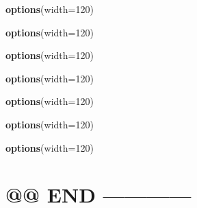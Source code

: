 \documentclass[
]{article}
\newenvironment{Shaded}{\begin{snugshade}}{\end{snugshade}}
\newcommand{\AttributeTok}[1]{\textcolor[rgb]{0.13,0.29,0.53}{#1}}
\newcommand{\DecValTok}[1]{\textcolor[rgb]{0.00,0.00,0.81}{#1}}
\newcommand{\FunctionTok}[1]{\textcolor[rgb]{0.13,0.29,0.53}{\textbf{#1}}}
\newcommand{\NormalTok}[1]{#1}
\begin{document}
\begin{Shaded}
\begin{Highlighting}[]
\FunctionTok{options}\NormalTok{(}\AttributeTok{width=}\DecValTok{120}\NormalTok{)}
\end{Highlighting}
\end{Shaded}

\begin{Shaded}
\begin{Highlighting}[]
\FunctionTok{options}\NormalTok{(}\AttributeTok{width=}\DecValTok{120}\NormalTok{)}
\end{Highlighting}
\end{Shaded}

\begin{Shaded}
\begin{Highlighting}[]
\FunctionTok{options}\NormalTok{(}\AttributeTok{width=}\DecValTok{120}\NormalTok{)}
\end{Highlighting}
\end{Shaded}

\begin{Shaded}
\begin{Highlighting}[]
\FunctionTok{options}\NormalTok{(}\AttributeTok{width=}\DecValTok{120}\NormalTok{)}
\end{Highlighting}
\end{Shaded}

\begin{Shaded}
\begin{Highlighting}[]
\FunctionTok{options}\NormalTok{(}\AttributeTok{width=}\DecValTok{120}\NormalTok{)}
\end{Highlighting}
\end{Shaded}

\begin{Shaded}
\begin{Highlighting}[]
\FunctionTok{options}\NormalTok{(}\AttributeTok{width=}\DecValTok{120}\NormalTok{)}
\end{Highlighting}
\end{Shaded}

\begin{Shaded}
\begin{Highlighting}[]
\FunctionTok{options}\NormalTok{(}\AttributeTok{width=}\DecValTok{120}\NormalTok{)}
\end{Highlighting}
\end{Shaded}

\hypertarget{end}{%
\section{@@ END ------------}\label{end}}
\end{document}

